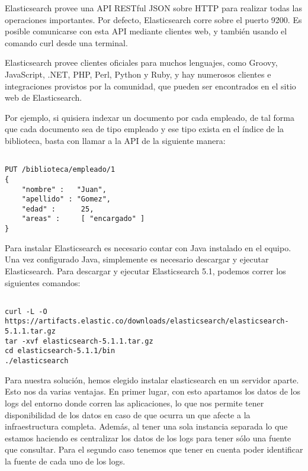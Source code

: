 Elasticsearch provee una API RESTful JSON sobre HTTP para realizar todas las
operaciones importantes. Por defecto, Elasticsearch corre sobre el puerto 9200.
Es posible comunicarse con esta API mediante clientes web, y también usando el
comando curl desde una terminal.

Elasticsearch provee clientes oficiales para muchos lenguajes, como Groovy,
JavaScript, .NET, PHP, Perl, Python y Ruby, y hay numerosos clientes e
integraciones provistos por la comunidad, que pueden ser encontrados en el
sitio web de Elasticsearch.

Por ejemplo, si quisiera indexar un documento por cada empleado, de tal forma
que cada documento sea de tipo empleado y ese tipo exista en el índice de la
biblioteca, basta con llamar a la API de la siguiente manera:

\begin{lstlisting}

PUT /biblioteca/empleado/1
{
    "nombre" :   "Juan",
    "apellido" : "Gomez",
    "edad" :      25,
    "areas" :     [ "encargado" ]
}

\end{lstlisting}


Para instalar Elasticsearch es necesario contar con Java instalado en el
equipo.  Una vez configurado Java, simplemente es necesario descargar y
ejecutar Elasticsearch.  Para descargar y ejecutar Elasticsearch 5.1, podemos
correr los siguientes comandos:

\begin{lstlisting}

curl -L -O https://artifacts.elastic.co/downloads/elasticsearch/elasticsearch-5.1.1.tar.gz
tar -xvf elasticsearch-5.1.1.tar.gz
cd elasticsearch-5.1.1/bin
./elasticsearch

\end{lstlisting}

Para nuestra solución, hemos elegido instalar elasticsearch en un servidor
aparte. Esto nos da varias ventajas. En primer lugar, con esto apartamos los
datos de los logs del entorno donde corren las aplicaciones, lo que nos permite
tener disponibilidad de los datos en caso de que ocurra un que afecte a la
infraestructura completa. Además, al tener una sola instancia separada lo que
estamos haciendo es centralizar los datos de los logs para tener sólo una
fuente que consultar. Para el segundo caso tenemos que tener en cuenta poder
identificar la fuente de cada uno de los logs.

